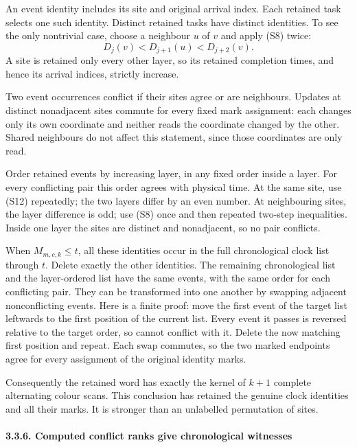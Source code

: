 \documentclass[
  11pt,
  a4paper,
]{article}
\begin{document}
An event identity includes its site and original arrival index. Each
retained task selects one such identity. Distinct retained tasks have
distinct identities. To see the only nontrivial case, choose a neighbour
\(u\) of \(v\) and apply (S8) twice: \[
D_j(v)<D_{j+1}(u)<D_{j+2}(v).
\tag{S12}
\] A site is retained only every other layer, so its retained completion
times, and hence its arrival indices, strictly increase.

Two event occurrences conflict if their sites agree or are neighbours.
Updates at distinct nonadjacent sites commute for every fixed mark
assignment: each changes only its own coordinate and neither reads the
coordinate changed by the other. Shared neighbours do not affect this
statement, since those coordinates are only read.

Order retained events by increasing layer, in any fixed order inside a
layer. For every conflicting pair this order agrees with physical time.
At the same site, use (S12) repeatedly; the two layers differ by an even
number. At neighbouring sites, the layer difference is odd; use (S8)
once and then repeated two-step inequalities. Inside one layer the sites
are distinct and nonadjacent, so no pair conflicts.

When \(M_{m,c,k}\leq t\), all these identities occur in the full
chronological clock list through \(t\). Delete exactly the other
identities. The remaining chronological list and the layer-ordered list
have the same events, with the same order for each conflicting pair.
They can be transformed into one another by swapping adjacent
nonconflicting events. Here is a finite proof: move the first event of
the target list leftwards to the first position of the current list.
Every event it passes is reversed relative to the target order, so
cannot conflict with it. Delete the now matching first position and
repeat. Each swap commutes, so the two marked endpoints agree for every
assignment of the original identity marks.

Consequently the retained word has exactly the kernel of \(k+1\)
complete alternating colour scans. This conclusion has retained the
genuine clock identities and all their marks. It is stronger than an
unlabelled permutation of sites.

\paragraph{3.3.6. Computed conflict ranks give chronological
witnesses}\label{computed-conflict-ranks-give-chronological-witnesses}
\end{document}
